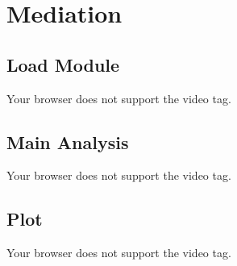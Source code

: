 \documentclass[
  letterpaper,
  DIV=11,
  numbers=noendperiod]{scrreprt}
\begin{document}
\hypertarget{mediation-1}{%
\section{Mediation}\label{mediation-1}}

\hypertarget{load-module}{%
\subsection{Load Module}\label{load-module}}

Your browser does not support the video tag.

\hypertarget{main-analysis-21}{%
\subsection{Main Analysis}\label{main-analysis-21}}

Your browser does not support the video tag.

\hypertarget{plot}{%
\subsection{Plot}\label{plot}}

Your browser does not support the video tag.
\end{document}
